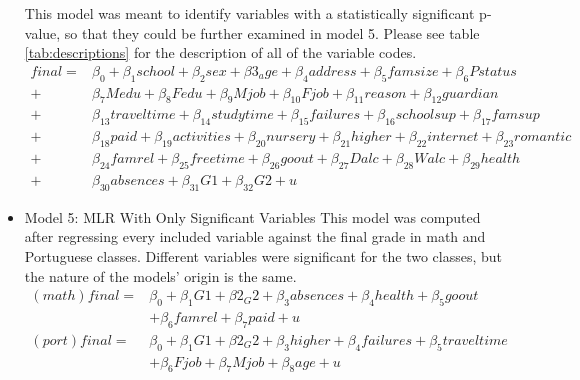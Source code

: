 \documentclass[12pt,english]{article}
\begin{document}
\begin{itemize}
This model was meant to identify variables with a statistically significant p-value, so that they could be further examined in model 5. Please see table \ref{tab:descriptions} for the description of all of the variable codes. 
\begin{equation}
    \begin{split}
        final = & \beta_0 + \beta_1school + \beta_2sex + \beta3_age + \beta_4address + \beta_5famsize + \beta_6Pstatus \\ + &\beta_7Medu + \beta_8Fedu + \beta_9Mjob + \beta_{10}Fjob + \beta_{11}reason + \beta_{12}guardian \\ + &\beta_{13}traveltime + \beta_{14}studytime + \beta_{15}failures + \beta_{16}schoolsup + \beta_{17}famsup \\ + &\beta_{18}paid + \beta_{19}activities + \beta_{20}nursery + \beta_{21}higher + \beta_{22}internet + \beta_{23}romantic \\ + &\beta_{24}famrel + \beta_{25}freetime + \beta_{26}goout + \beta_{27}Dalc + \beta_{28}Walc + \beta_{29}health \\ + &\beta_{30}absences + \beta_{31}G1 + \beta_{32}G2 + u
    \end{split}
\end{equation}

\item Model 5: MLR With Only Significant Variables
\label{model:5}
This model was computed after regressing every included variable against the final grade in math and Portuguese classes. Different variables were significant for the two classes, but the nature of the models' origin is the same. 
\begin{equation}
\begin{split}
(math) final = & \beta_0 + \beta_1G1 + \beta2_G2 + \beta_3absences + \beta_4health + \beta_5goout \\ & + \beta_6famrel + \beta_7paid + u \\
(port) final = & \beta_0 + \beta_1G1 + \beta2_G2 + \beta_3higher + \beta_4failures + \beta_5traveltime \\& + \beta_6Fjob + \beta_7Mjob + \beta_8age + u
\end{split}
\end{equation}


\end{itemize}
\end{document}
